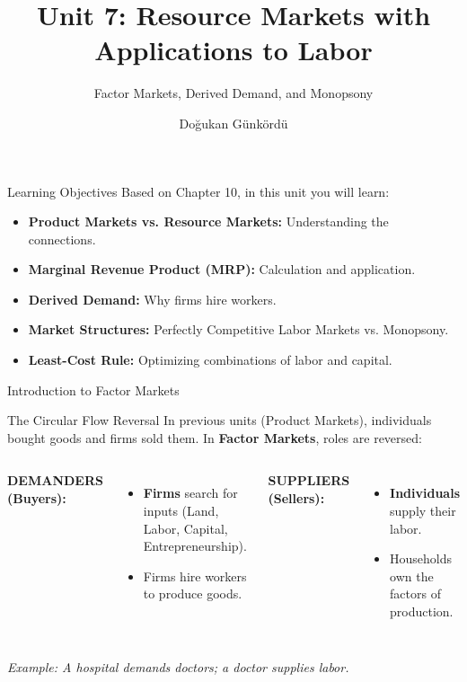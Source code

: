 \documentclass[aspectratio=169]{beamer}
\title{Unit 7: Resource Markets with Applications to Labor}
\subtitle{Factor Markets, Derived Demand, and Monopsony}
\author{Doğukan Günkördü}
\date{}
\begin{document}
\begin{frame}
    \titlepage
\end{frame}

\begin{frame}{Learning Objectives}
    Based on Chapter 10, in this unit you will learn:
    \begin{itemize}
        \item \textbf{Product Markets vs. Resource Markets:} Understanding the connections.
        \item \textbf{Marginal Revenue Product (MRP):} Calculation and application.
        \item \textbf{Derived Demand:} Why firms hire workers.
        \item \textbf{Market Structures:} Perfectly Competitive Labor Markets vs. Monopsony.
        \item \textbf{Least-Cost Rule:} Optimizing combinations of labor and capital.
    \end{itemize}
\end{frame}

\begin{frame}{Introduction to Factor Markets}
    \begin{block}{The Circular Flow Reversal}
        In previous units (Product Markets), individuals bought goods and firms sold them. In \textbf{Factor Markets}, roles are reversed:
    \end{block}
    
    \vspace{0.5cm}
    
    \begin{columns}
        \textbf{DEMANDERS (Buyers):}
        \begin{itemize}
            \item \textbf{Firms} search for inputs (Land, Labor, Capital, Entrepreneurship).
            \item Firms hire workers to produce goods.
        \end{itemize}
        
        \textbf{SUPPLIERS (Sellers):}
        \begin{itemize}
            \item \textbf{Individuals} supply their labor.
            \item Households own the factors of production.
        \end{itemize}
    \end{columns}
    
    \vspace{0.5cm}
    \textit{Example: A hospital demands doctors; a doctor supplies labor.}
\end{frame}
\end{document}
